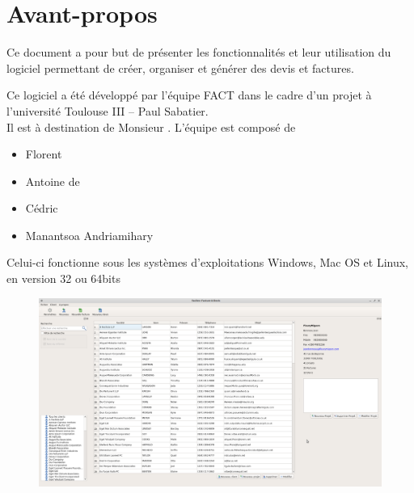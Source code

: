 \chapter*{Avant-propos}
Ce document a pour but de présenter les fonctionnalités et leur utilisation du logiciel permettant
de créer, organiser et générer des devis et factures. 

Ce logiciel a été développé par l'équipe FACT dans le cadre d'un projet à l'université Toulouse III -- Paul Sabatier. \\
Il est à destination de Monsieur .
L'équipe est composé de 
\begin{itemize}
	\item Florent 
	\item Antoine de 
	\item Cédric 
	\item Manantsoa Andriamihary 
\end{itemize}

Celui-ci fonctionne sous les systèmes d’exploitations Windows, Mac OS et Linux, en version 32 ou 64bits
\begin{figure}[H]
	\centering
	\includegraphics[width=14cm]{screens/intro.png}
\end{figure}
